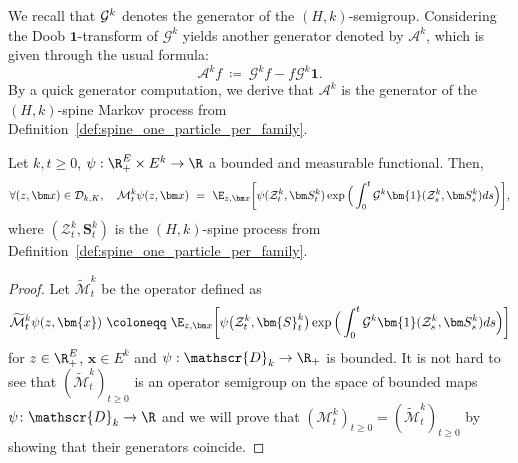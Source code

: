 \begin{refsegment}
We recall that ${\cal G}^k$
denotes the generator of the $(H,k)$-semigroup.
Considering the Doob $\bm{1}$-transform of $\mathcal{G}^k$ yields another generator denoted by $\mathcal{A}^k$, which is given through the usual formula:
 \begin{equation}\label{Ch4:eq:palmoswski_changegen}
 \mathcal{A}^kf\ \coloneqq\ \mathcal{G}^kf-f\mathcal{G}^k\bm{1}.
 \end{equation}
By a quick generator computation, we derive that $\mathcal{A}^k$ is the generator of the $(H,k)$-spine Markov process from Definition~\ref{def:spine_one_particle_per_family}.
\begin{prop}\label{Ch4:prop:P_semigroup_feyman_kac}
Let $k, t\geq 0$, $\psi:\R_+^E\times E^k\to \R$ a bounded and measurable functional. Then, 
\begin{equation} \label{Ch4:eq:FeynmanKac}
\forall (z, \bm x)\in {\cal D}_{k,K}, \ \ \
\mathcal{M}^k_t{\psi}(z, \bm x) \ =\ \E_{z, \bm x}\bigg[ \psi(\mathcal{Z}^k_t, \bm S^k_t) \exp\Big(\int_0^t\mathcal{G}^k\bm{1}(\mathcal{Z}^k_s,\bm S^k_s)ds\Big)\bigg],
\end{equation}
where $(\mathcal{Z}^k_t,\bm S^k_t)$ is the $(H,k)$-spine process from Definition~\ref{def:spine_one_particle_per_family}. 
\end{prop}
\begin{proof}
Let $\widetilde{\mathcal{M}}^k_t$ be the operator defined as
\[
    \widetilde{\mathcal{M}}^k_t\psi(z, \bm{x})
    \ \coloneqq\ \E_{z,\bm x}\bigg[\psi\big(\mathcal{Z}^k_t,\bm{S}^k_t\big)\exp\Big(\int_0^t \mathcal{G}^k\bm{1}(\mathcal{Z}^k_s,\bm S^k_s)ds\Big)\bigg]
\]
for $z\in\R_+^E$, $\bm{x} \in  E^k$ and $\psi:\mathscr{D}_{k} \to \R_+$ is bounded. It is not hard to see that $(\widetilde{\mathcal{M}}^k_t)_{t \ge 0}$ is an operator semigroup on the space of bounded maps $\psi \colon \mathscr{D}_{k} \to \R$ and we will prove that $(\mathcal{M}^k_t)_{t \ge 0} = (\widetilde{\mathcal{M}}^k_t)_{t \ge 0}$ by showing that their generators coincide. 


\end{proof}
\end{refsegment}

